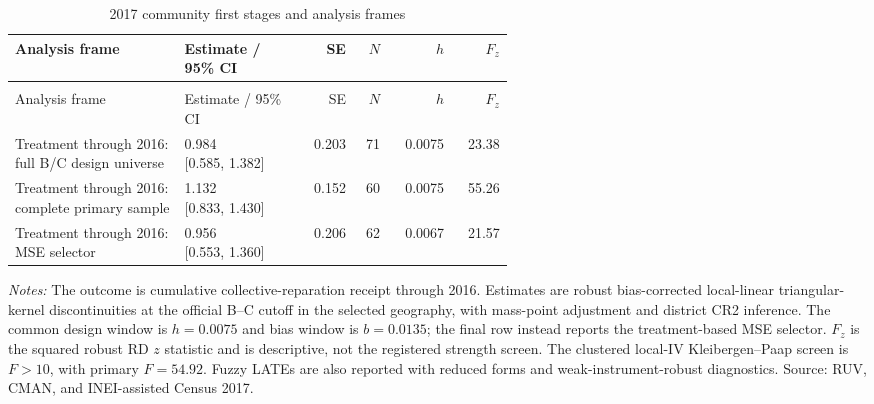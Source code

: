 \begingroup\fontsize{9.25}{11.4}\selectfont
\setlength{\tabcolsep}{3pt}\renewcommand{\arraystretch}{1.18}
\begin{longtable}{@{}>{\raggedright\arraybackslash}p{0.34\linewidth}p{0.24\linewidth}rrrr@{}}
\caption{2017 community first stages and analysis frames}\label{tab:pub_A18} \\
\toprule Analysis frame & Estimate / 95\% CI & SE & \(N\) & \(h\) & \(F_z\) \\ \midrule\endfirsthead
\multicolumn{6}{c}{\tablename\ \thetable{} -- continued} \\
\toprule Analysis frame & Estimate / 95\% CI & SE & \(N\) & \(h\) & \(F_z\) \\ \midrule\endhead
Treatment through 2016: full B/C design universe & \shortstack[r]{0.984 \\{} [0.585, 1.382]} & 0.203 & 71 & 0.0075 & 23.38 \\
Treatment through 2016: complete primary sample & \shortstack[r]{1.132 \\{} [0.833, 1.430]} & 0.152 & 60 & 0.0075 & 55.26 \\
Treatment through 2016: MSE selector & \shortstack[r]{0.956 \\{} [0.553, 1.360]} & 0.206 & 62 & 0.0067 & 21.57 \\
\bottomrule\end{longtable}
\parbox{0.97\linewidth}{\footnotesize \textit{Notes:} The outcome is cumulative collective-reparation receipt through 2016. Estimates are robust bias-corrected local-linear triangular-kernel discontinuities at the official B--C cutoff in the selected geography, with mass-point adjustment and district CR2 inference. The common design window is \(h=0.0075\) and bias window is \(b=0.0135\); the final row instead reports the treatment-based MSE selector. \(F_z\) is the squared robust RD \(z\) statistic and is descriptive, not the registered strength screen. The clustered local-IV Kleibergen--Paap screen is \(F>10\), with primary \(F=54.92\). Fuzzy LATEs are also reported with reduced forms and weak-instrument-robust diagnostics. Source: RUV, CMAN, and INEI-assisted Census 2017.}
\par{}\par\endgroup
